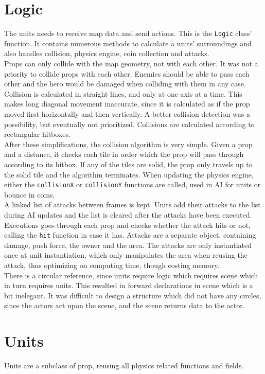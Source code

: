 \section{Logic} %
The units needs to receive map data and send actions. This is the {\tt Logic} class' function. It contains numerous methods to calculate a units' surroundings and also handles collision, physics engine, coin collection and attacks.\\
Props can only collide with the map geometry, not with each other. It was not a priority to collide props with each other. Enemies should be able to pass each other and the hero would be damaged when colliding with them in any case. Collision is calculated in straight lines, and only at one axis at a time. This makes long diagonal movement inaccurate, since it is calculated as if the prop moved first horizontally and then vertically. A better collision detection was a possibility, but eventually not prioritized. Collisions are calculated according to rectangular hitboxes.\\
After these simplifications, the collision algorithm is very simple. Given a prop and a distance, it checks each tile in order which the prop will pass through according to its hitbox. If any of the tiles are solid, the prop only travels up to the solid tile and the algorithm terminates. When updating the physics engine, either the {\tt collisionX} or {\tt collisionY} functions are called, used in AI for units or bounce in coins.\\
A linked list of attacks between frames is kept. Units add their attacks to the list during AI updates and the list is cleared after the attacks have been executed. Executions goes through each prop and checks whether the attack hits or not, calling the {\tt hit} function in case it has. Attacks are a separate object, containing damage, push force, the owner and the area. The attacks are only instantiated once at unit instantiation, which only manipulates the area when reusing the attack, thus optimizing on computing time, though costing memory.\\
There is a circular reference, since units require logic which requires scene which in turn requires units. This resulted in forward declarations in scene which is a bit inelegant. It was difficult to design a structure which did not have any circles, since the actors act upon the scene, and the scene returns data to the actor.

\section{Units}
Units are a subclass of prop, reusing all physics related functions and fields.


